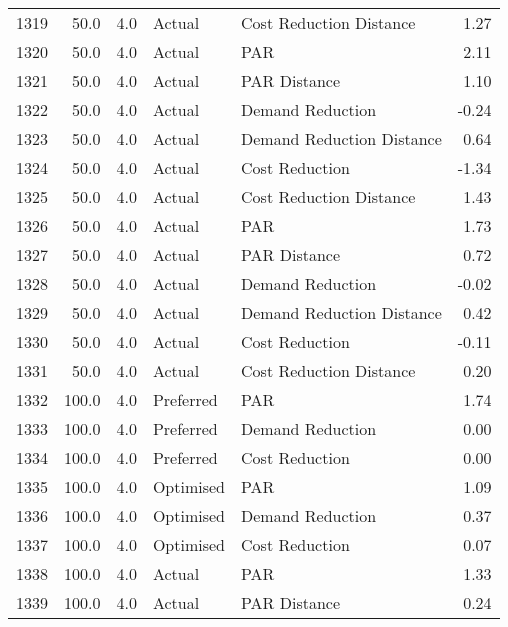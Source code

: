 \begin{longtable}{lrrllr}
1319 &         50.0 &     4.0 &         Actual &    Cost Reduction Distance &   1.27 \\
1320 &         50.0 &     4.0 &         Actual &                        PAR &   2.11 \\
1321 &         50.0 &     4.0 &         Actual &               PAR Distance &   1.10 \\
1322 &         50.0 &     4.0 &         Actual &           Demand Reduction &  -0.24 \\
1323 &         50.0 &     4.0 &         Actual &  Demand Reduction Distance &   0.64 \\
1324 &         50.0 &     4.0 &         Actual &             Cost Reduction &  -1.34 \\
1325 &         50.0 &     4.0 &         Actual &    Cost Reduction Distance &   1.43 \\
1326 &         50.0 &     4.0 &         Actual &                        PAR &   1.73 \\
1327 &         50.0 &     4.0 &         Actual &               PAR Distance &   0.72 \\
1328 &         50.0 &     4.0 &         Actual &           Demand Reduction &  -0.02 \\
1329 &         50.0 &     4.0 &         Actual &  Demand Reduction Distance &   0.42 \\
1330 &         50.0 &     4.0 &         Actual &             Cost Reduction &  -0.11 \\
1331 &         50.0 &     4.0 &         Actual &    Cost Reduction Distance &   0.20 \\
1332 &        100.0 &     4.0 &      Preferred &                        PAR &   1.74 \\
1333 &        100.0 &     4.0 &      Preferred &           Demand Reduction &   0.00 \\
1334 &        100.0 &     4.0 &      Preferred &             Cost Reduction &   0.00 \\
1335 &        100.0 &     4.0 &      Optimised &                        PAR &   1.09 \\
1336 &        100.0 &     4.0 &      Optimised &           Demand Reduction &   0.37 \\
1337 &        100.0 &     4.0 &      Optimised &             Cost Reduction &   0.07 \\
1338 &        100.0 &     4.0 &         Actual &                        PAR &   1.33 \\
1339 &        100.0 &     4.0 &         Actual &               PAR Distance &   0.24 \\

\end{longtable}
